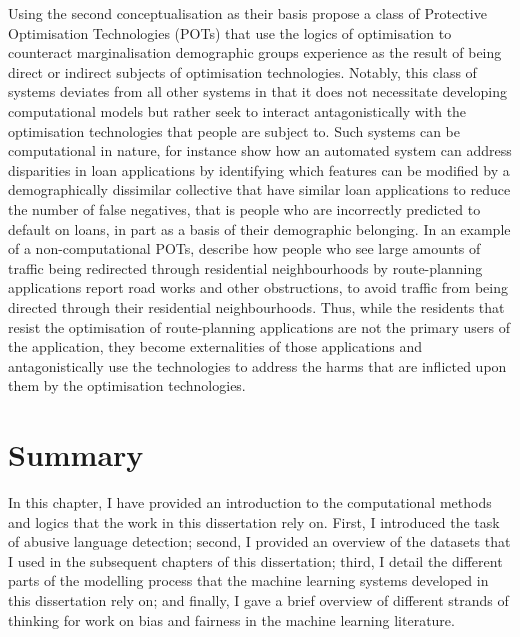 Using the second conceptualisation as their basis \citet{Kulynych:2020} propose a class of Protective Optimisation Technologies (POTs) that use the logics of optimisation to counteract marginalisation demographic groups experience as the result of being direct or indirect subjects of optimisation technologies.
Notably, this class of systems deviates from all other systems in that it does not necessitate developing computational models but rather seek to interact antagonistically with the optimisation technologies that people are subject to.
Such systems can be computational in nature, for instance \citet{Kulynych:2020} show how an automated system can address disparities in loan applications by identifying which features can be modified by a demographically dissimilar collective that have similar loan applications to reduce the number of false negatives, that is people who are incorrectly predicted to default on loans, in part as a basis of their demographic belonging.
In an example of a non-computational POTs, \citet{Kulynych:2020} describe how people who see large amounts of traffic being redirected through residential neighbourhoods by route-planning applications report road works and other obstructions, to avoid traffic from being directed through their residential neighbourhoods. Thus, while the residents that resist the optimisation of route-planning applications are not the primary users of the application, they become externalities of those applications and antagonistically use the technologies to address the harms that are inflicted upon them by the optimisation technologies.


\section{Summary}

In this chapter, I have provided an introduction to the computational methods and logics that the work in this dissertation rely on. First, I introduced the task of abusive language detection; second, I provided an overview of the datasets that I used in the subsequent chapters of this dissertation; third, I detail the different parts of the modelling process that the machine learning systems developed in this dissertation rely on; and finally, I gave a brief overview of different strands of thinking for work on bias and fairness in the machine learning literature.
